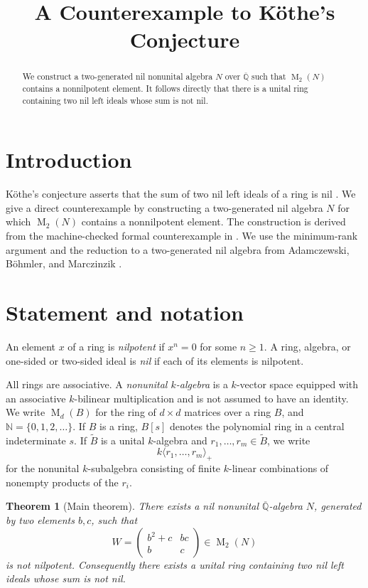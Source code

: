 \documentclass[11pt]{article}
\title{A Counterexample to K\"othe's Conjecture}
\author{}
\date{}
\newtheorem{theorem}{Theorem}[section]
\newcommand{\NN}{\mathbb N}
\newcommand{\Mat}{\operatorname{M}}
\begin{document}
\maketitle

\begin{abstract}
We construct a two-generated nil nonunital algebra $N$ over $\overline{\mathbb Q}$ such that $\Mat_2(N)$ contains a nonnilpotent element.  It follows directly that there is a unital ring containing two nil left ideals whose sum is not nil.
\end{abstract}

\section{Introduction}\label{sec:introduction}

K\"othe's conjecture asserts that the sum of two nil left ideals of a ring is nil \cite{Kothe1930}.  We give a direct counterexample by constructing a two-generated nil algebra $N$ for which $\Mat_2(N)$ contains a nonnilpotent element.  The construction is derived from the machine-checked formal counterexample in \cite{Adamczewski2026}.  We use the minimum-rank argument and the reduction to a two-generated nil algebra from Adamczewski, B\"ohmler, and Marczinzik \cite[Lemma~4.6 and Theorem~1.1]{ABM2026}.

\section{Statement and notation}\label{sec:statement}

An element $x$ of a ring is \emph{nilpotent} if $x^n=0$ for some $n\ge1$.  A ring, algebra, or one-sided or two-sided ideal is \emph{nil} if each of its elements is nilpotent.

All rings are associative.  A \emph{nonunital $k$-algebra} is a $k$-vector space equipped with an associative $k$-bilinear multiplication and is not assumed to have an identity.  We write $\Mat_d(B)$ for the ring of $d\times d$ matrices over a ring $B$, and $\NN=\{0,1,2,\ldots\}$.  If $B$ is a ring, $B[s]$ denotes the polynomial ring in a central indeterminate $s$.  If $\widetilde B$ is a unital $k$-algebra and $r_1,\ldots,r_m\in\widetilde B$, we write
\[
k\langle r_1,\ldots,r_m\rangle_+
\]
for the nonunital $k$-subalgebra consisting of finite $k$-linear combinations of nonempty products of the $r_i$.

\begin{theorem}[Main theorem]\label{thm:main}
There exists a nil nonunital $\overline{\mathbb Q}$-algebra $N$, generated by two elements $b,c$, such that
\[
W=\begin{pmatrix}
b^2+c&bc\\
b&c
\end{pmatrix}\in\Mat_2(N)
\]
is not nilpotent.  Consequently there exists a unital ring containing two nil left ideals whose sum is not nil.
\end{theorem}
\end{document}
